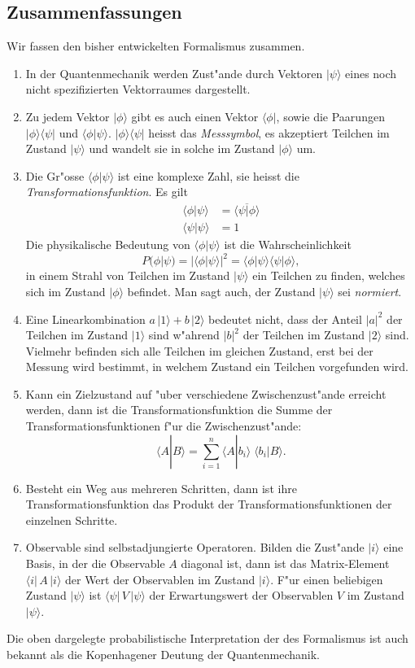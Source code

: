 \subsection{Zusammenfassungen}
Wir fassen den bisher entwickelten Formalismus zusammen.

\begin{enumerate}
\item
In der Quantenmechanik werden Zust"ande durch Vektoren $|\psi\rangle$
eines noch nicht spezifizierten Vektorraumes dargestellt.
\item
Zu jedem Vektor $|\phi\rangle$ gibt es auch einen Vektor $\langle \phi|$,
sowie die Paarungen
$|\phi\rangle\langle\psi|$
und
$\langle\phi|\psi\rangle$.
$|\phi\rangle\langle\psi|$ heisst das {\em Messsymbol}, es akzeptiert Teilchen im
Zustand $|\psi\rangle$ und wandelt sie in solche im Zustand $|\phi\rangle$
um.
\item
Die Gr"osse $\langle \phi|\psi\rangle$ ist eine komplexe Zahl, sie
heisst die {\em Transformationsfunktion}. Es gilt
\begin{align*}
\langle \phi|\psi\rangle
&=
\overline{
\langle \psi|\phi\rangle
}
\\
\langle\psi|\psi\rangle&=1
\end{align*}
Die physikalische Bedeutung von $\langle\phi|\psi\rangle$ ist die
Wahrscheinlichkeit
\[
P(\phi|\psi)=|\langle \phi|\psi\rangle|^2=
\langle\phi|\psi\rangle
\langle\psi|\phi\rangle,
\]
in einem Strahl von Teilchen im Zustand $|\psi\rangle$ ein Teilchen zu
finden, welches sich im Zustand $|\phi\rangle$ befindet.
Man sagt auch, der Zustand $|\psi\rangle$ sei {\em normiert}.
%
\item
Eine Linearkombination $a\,|1\rangle + b\,|2\rangle$ bedeutet nicht,
dass der Anteil $|a|^2$ der Teilchen im Zustand $|1\rangle$ sind
w"ahrend $|b|^2$ der Teilchen im Zustand $|2\rangle$ sind.
Vielmehr befinden sich alle Teilchen im gleichen Zustand,
erst bei der Messung wird bestimmt, in welchem Zustand ein Teilchen
vorgefunden wird.
\item
Kann ein Zielzustand auf "uber verschiedene Zwischenzust"ande
erreicht werden, dann ist die Transformationsfunktion die Summe
der Transformationsfunktionen f"ur die Zwischenzust"ande:
\[
\langle A|B\rangle
=
\sum_{i=1}^n\langle A|b_i\rangle\;\langle b_i|B\rangle.
\]
\item
Besteht ein Weg aus mehreren Schritten, dann ist ihre Transformationsfunktion
das Produkt der Transformationsfunktionen der einzelnen Schritte.
\item 
Observable sind selbstadjungierte Operatoren.
Bilden die Zust"ande $|i\rangle$ eine Basis, in der die Observable $A$ 
diagonal ist, dann ist das Matrix-Element $\langle i|\,A\,|i\rangle$ der
Wert der Observablen im Zustand $|i\rangle$. F"ur einen beliebigen
Zustand $|\psi\rangle$ ist $\langle\psi|\,V\,|\psi\rangle$ der Erwartungswert
der Observablen $V$ im Zustand $|\psi\rangle$.
\end{enumerate}
Die oben dargelegte probabilistische Interpretation der des Formalismus
ist auch bekannt als die Kopenhagener Deutung der Quantenmechanik.
%
%
%
